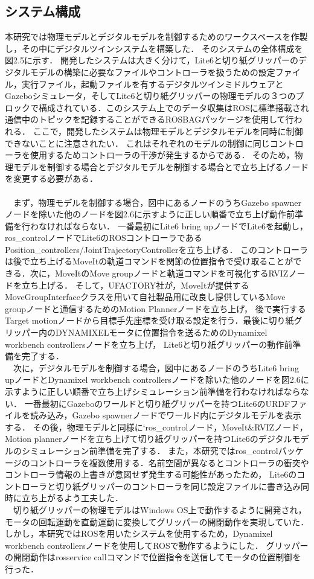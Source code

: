 \subsection{システム構成}
本研究では物理モデルとデジタルモデルを制御するためのワークスペースを作製し，その中にデジタルツインシステムを構築した．
そのシステムの全体構成を図2.5に示す．
開発したシステムは大きく分けて，Lite6と切り紙グリッパーのデジタルモデルの構築に必要なファイルやコントローラを扱うための設定ファイル，実行ファイル，起動ファイルを有するデジタルツインミドルウェアと
Gazeboシミュレータ，そしてLite6と切り紙グリッパーの物理モデルの３つのブロックで構成されている．このシステム上でのデータ収集はROSに標準搭載され通信中のトピックを記録することができるROSBAGパッケージを使用して行われる．
ここで，開発したシステムは物理モデルとデジタルモデルを同時に制御できないことに注意されたい．
これはそれぞれのモデルの制御に同じコントローラを使用するためコントローラの干渉が発生するからである．
そのため，物理モデルを制御する場合とデジタルモデルを制御する場合とで立ち上げるノードを変更する必要がある．\\\\
　まず，物理モデルを制御する場合，図中にあるノードのうちGazebo spawnerノードを除いた他のノードを図2.6に示すように正しい順番で立ち上げ動作前準備を行わなければならない．
一番最初にLite6 bring upノードでLite6を起動し，ros\_controlノードでLite6のROSコントローラであるPosition\_controllers/JointTrajectoryControllerを立ち上げる．
このコントローラは後で立ち上げるMoveItの軌道コマンドを関節の位置指令で受け取ることができる．次に，MoveItのMove groupノードと軌道コマンドを可視化するRVIZノードを立ち上げる．
そして，UFACTORY社が，MoveItが提供するMoveGroupInterfaceクラスを用いて自社製品用に改良し提供しているMove groupノードと通信するためのMotion Plannerノードを立ち上げ，
後で実行するTarget motionノードから目標手先座標を受け取る設定を行う．最後に切り紙グリッパー内のDYNAMIXELモータに位置指令を送るためのDynamixel workbench controllersノードを立ち上げ，
Lite6と切り紙グリッパーの動作前準備を完了する．\\
　次に，デジタルモデルを制御する場合，図中にあるノードのうちLite6 bring upノードとDynamixel workbench controllersノードを除いた他のノードを図2.6に示すように正しい順番で立ち上げシミュレーション前準備を行わなければならない．
一番最初にGazeboのワールドと切り紙グリッパーを持つLite6のURDFファイルを読み込み，Gazebo spawnerノードでワールド内にデジタルモデルを表示する．
その後，物理モデルと同様に`ros\_controlノード，MoveIt\&RVIZノード，Motion plannerノードを立ち上げて切り紙グリッパーを持つLite6のデジタルモデルのシミュレーション前準備を完了する．
また，本研究ではros\_controlパッケージのコントローラを複数使用する．名前空間が異なるとコントローラの衝突やコントローラ情報の上書きが意図せず発生する可能性があったため，
Lite6のコントローラと切り紙グリッパーのコントローラを同じ設定ファイルに書き込み同時に立ち上がるよう工夫した．\\
　切り紙グリッパーの物理モデルはWindows OS上で動作するように開発され，モータの回転運動を直動運動に変換してグリッパーの開閉動作を実現していた．
しかし，本研究ではROSを用いたシステムを使用するため，Dynamixel workbench controllersノードを使用してROSで動作するようにした．
グリッパーの開閉動作はrosservice callコマンドで位置指令を送信してモータの位置制御を行った．

